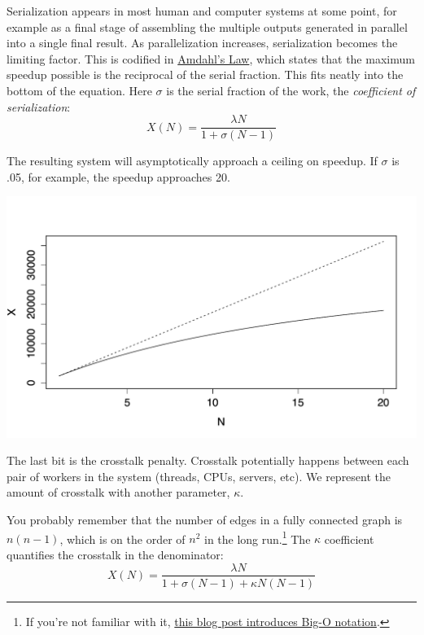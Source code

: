 \documentclass{vivid_layout}
\begin{document}
Serialization appears in most human and computer systems at some point, for
example as a final stage of assembling the multiple outputs generated in
parallel into a single final result. As parallelization increases, serialization
becomes the limiting factor. This is codified in
\href{https://en.wikipedia.org/wiki/Amdahl\%27s\_law}{Amdahl's Law}, which states that
the maximum speedup possible is the reciprocal of the serial fraction. This fits
neatly into the bottom of the equation. Here $\sigma$ is the serial fraction of
the work, the {\itshape coefficient of serialization}:
\[
X(N) = \frac{\lambda N}{1 + \sigma(N-1)}
\]

The resulting system will asymptotically approach a ceiling on speedup. If
$\sigma$ is .05, for example, the speedup approaches 20.
\begin{center}
\includegraphics[width=.85\linewidth]{scalability/amdahl}
\end{center}

The last bit is the crosstalk penalty. Crosstalk potentially happens between
each pair of workers in the system (threads, CPUs, servers, etc). We represent the amount of crosstalk with another parameter, $\kappa$.

You probably remember that the number of edges in a fully connected graph is
$n(n-1)$, which is on the order of $n^2$ in the long run.\footnote{If you're
not familiar with it,
\href{https://www.vividcortex.com/blog/2013/10/23/big-o-notation-made-simple/}{this
blog post introduces Big-O notation}.} The $\kappa$ coefficient quantifies the
crosstalk in the denominator:
\[
X(N) = \frac{\lambda N}{1 + \sigma(N-1) + \kappa N(N-1)}
\]
\end{document}
